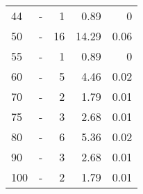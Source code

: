\begin{longtable}{lXrrr}
        44 & \multicolumn{1}{X}{-} & %
          \num{1} &
          \num[round-mode=places,round-precision=2]{0.89} &
          \num[round-mode=places,round-precision=2]{0} \\

        50 & \multicolumn{1}{X}{-} & %
          \num{16} &
          \num[round-mode=places,round-precision=2]{14.29} &
          \num[round-mode=places,round-precision=2]{0.06} \\

        55 & \multicolumn{1}{X}{-} & %
          \num{1} &
          \num[round-mode=places,round-precision=2]{0.89} &
          \num[round-mode=places,round-precision=2]{0} \\

        60 & \multicolumn{1}{X}{-} & %
          \num{5} &
          \num[round-mode=places,round-precision=2]{4.46} &
          \num[round-mode=places,round-precision=2]{0.02} \\

        70 & \multicolumn{1}{X}{-} & %
          \num{2} &
          \num[round-mode=places,round-precision=2]{1.79} &
          \num[round-mode=places,round-precision=2]{0.01} \\

        75 & \multicolumn{1}{X}{-} & %
          \num{3} &
          \num[round-mode=places,round-precision=2]{2.68} &
          \num[round-mode=places,round-precision=2]{0.01} \\

        80 & \multicolumn{1}{X}{-} & %
          \num{6} &
          \num[round-mode=places,round-precision=2]{5.36} &
          \num[round-mode=places,round-precision=2]{0.02} \\

        90 & \multicolumn{1}{X}{-} & %
          \num{3} &
          \num[round-mode=places,round-precision=2]{2.68} &
          \num[round-mode=places,round-precision=2]{0.01} \\

        100 & \multicolumn{1}{X}{-} & %
          \num{2} &
          \num[round-mode=places,round-precision=2]{1.79} &
          \num[round-mode=places,round-precision=2]{0.01} \\


\end{longtable}
